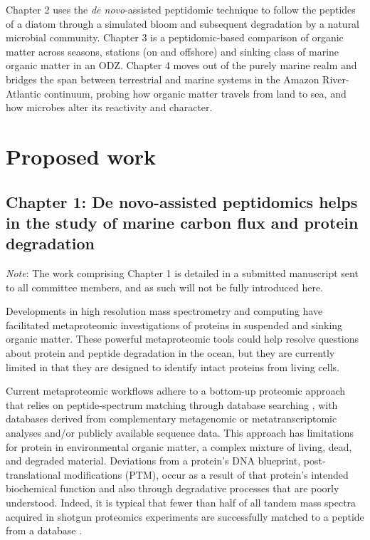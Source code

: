 \documentclass[12pt, letterpaper, twoside]{article}
\begin{document}
Chapter 2 uses the \textit{de novo}-assisted peptidomic technique to follow the peptides of a diatom through a simulated bloom and subsequent degradation by a natural microbial community. Chapter 3 is a peptidomic-based comparison of organic matter across seasons, stations (on and offshore) and sinking class of marine organic matter in an ODZ. Chapter 4 moves out of the purely marine realm and bridges the span between terrestrial and marine systems in the Amazon River-Atlantic continuum, probing how organic matter travels from land to sea, and how microbes alter its reactivity and character.

\newpage

\section{Proposed work}

\subsection{{Chapter 1: De novo}-assisted peptidomics helps in the study of marine carbon flux and protein degradation}

\textit{Note}: The work comprising Chapter 1 is detailed in a submitted manuscript sent to all committee members, and as such will not be fully introduced here. 

Developments in high resolution mass spectrometry and computing have facilitated metaproteomic investigations of proteins in suspended \cite{dong_characterization_2010, bridoux_suspended_2015, bergauer_organic_2017} and sinking \cite{moore_identifying_2012} organic matter. These powerful metaproteomic tools could help resolve questions about protein and peptide degradation in the ocean, but they are currently limited in that they are designed to identify intact proteins from living cells.

Current metaproteomic workflows adhere to a bottom-up proteomic approach that relies on peptide-spectrum matching through database searching \cite{saito_progress_2019}, with databases derived from  complementary metagenomic or metatranscriptomic analyses and/or publicly available sequence data. This approach has limitations for protein in environmental organic matter, a complex mixture of living, dead, and degraded material. Deviations from a protein's DNA blueprint, post-translational modifications (PTM), occur as a result of that protein’s intended biochemical function and also through degradative processes \cite{kim_methionine_2014} that are poorly understood. Indeed, it is typical that fewer than half of all tandem mass spectra acquired in shotgun proteomics experiments are successfully matched to a peptide from a database \cite{chick_mass-tolerant_2015}. 
\end{document}
